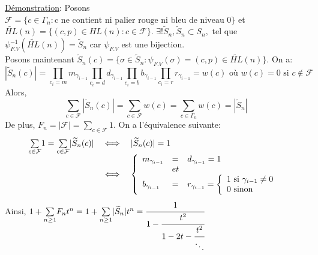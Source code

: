 			\underline{Démonstration}:
				Posons $ \mathcal{F} = \{ c \in \Gamma_{n} : \text{c ne contient ni palier rouge ni bleu de niveau 0}  \} $ et $\widetilde{HL}(n)= \{ (c,p) \in HL(n) : c \in \mathcal{F} \}$. $\exists!\widetilde{S}_{n}, \widetilde{S}_{n}\subset S_{n},$ tel que $\psi^{-1}_{F.V}(\widetilde{HL}(n)) =  \widetilde{S}_{n}$ car $ \psi_{F.V} $ est une bijection.\\
				Posons maintenant $ \widetilde{S}_{n}(c) = \{ \sigma \in \widetilde{S}_{n}: \psi_{F.V}(\sigma)=(c,p) \in \widetilde{HL}(n) \} $. On a: 
				\[
					|\widetilde{S}_{n}(c)| = \underset{c_{i}=m}{\prod}m_{\gamma_{i-1}} \underset{c_{i}=d}{\prod}d_{\gamma_{i-1}} \underset{c_{i}=b}{\prod}b_{\gamma_{i-1}} \underset{c_{i}=r}{\prod}r_{\gamma_{i-1}} = w(c) \text{ où } w(c)=0 \text{ si } c\notin \mathcal{F}
				\]
				Alors, 
				\[
					\underset{c \in \mathcal{F}}{\sum} |\widetilde{S}_{n}(c)| = \underset{c \in \mathcal{F}}{\sum}w(c) =  \underset{c \in \Gamma_{n}}{\sum}w(c) = |\widetilde{S}_{n}|
				\]
				De plus, $F_{n} = |\mathcal{F}| = \underset{c \in \mathcal{F}}{\sum}1$. On a l'équivalence suivante: 
				\[
				\begin{array} {l l l}
					\underset{c\in \mathcal{F}}{\sum}1 = \underset{c \in \mathcal{F}}{\sum} |\widetilde{S}_{n}(c)| &\iff& |\widetilde{S}_{n}(c)| = 1\\
					&\iff& \left\{ \begin{array}{l l l}
										m_{\gamma_{i-1}} &= & d_{\gamma_{i-1}} = 1\\
														 &et&\\
										 b_{\gamma_{i-1}} &=& r_{\gamma_{i-1}} = \left\{ \begin{array}														{l l l}
										 												1 \text{ si } \gamma_{i-1} \neq 0\\
										 												0 \text{ sinon }
										 												\end{array} \right.

									\end{array}
							\right.

				\end{array}
				\]
				Ainsi, $1 + \underset{n \geq 1}{\sum}F_{n}t^{n} = 1+\underset{n \geq 1 }{\sum}|\widetilde{S}_{n}|t^{n} = \cfrac{1}{1 - \cfrac{t^2}{1 - 2t - \cfrac{t^2}{\ddots}}}$

